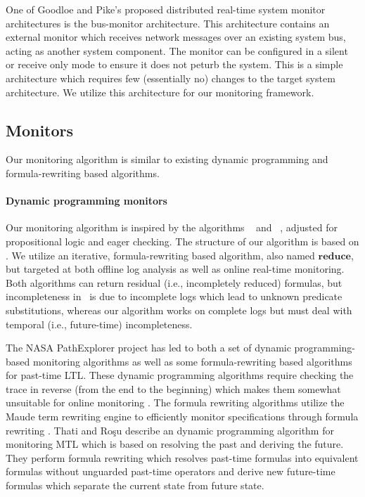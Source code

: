 One of Goodloe and Pike's proposed distributed real-time system monitor architectures is the bus-monitor architecture.
This architecture contains an external monitor which receives network messages over an existing system bus, acting as another system component.
The monitor can be configured in a silent or receive only mode to ensure it does not peturb the system. 
This is a simple architecture which requires few (essentially no) changes to the target system architecture. We utilize this architecture for our monitoring framework. 


\subsection{Monitors}
Our monitoring algorithm is similar to existing dynamic programming and formula-rewriting based algorithms. 
\paragraph{Dynamic programming monitors}
Our monitoring algorithm is inspired by the algorithms \greduce\ \cite{Garg2011} and \precis\ \cite{Chowdhury2014}, adjusted for propositional logic and eager checking. 
The structure of our algorithm is based on \greduce{}. 
We utilize an iterative, formula-rewriting based algorithm, also named $\mathbf{reduce}$, but targeted at both offline log analysis as well as online real-time monitoring. 
Both algorithms can return residual (i.e., incompletely reduced) formulas, but incompleteness in \greduce\ is due to incomplete logs which lead to unknown predicate substitutions, whereas our algorithm works on complete logs but must deal with temporal (i.e., future-time) incompleteness. 

The NASA PathExplorer project has led to both a set of dynamic programming-based monitoring algorithms as well as some formula-rewriting based algorithms \cite{Havelund2004} for past-time LTL. These dynamic programming algorithms require checking the trace in reverse (from the end to the beginning) which makes them somewhat unsuitable for online monitoring \cite{Havelund2002}. The formula rewriting algorithms utilize the Maude term rewriting engine to efficiently monitor specifications through formula rewriting \cite{Rosu2005}. 
%
Thati and Ro\c{s}u \cite{Thati2005} describe an dynamic programming algorithm for monitoring MTL which is based on resolving the past and deriving the future. They perform formula rewriting which resolves past-time formulas into equivalent formulas without unguarded past-time operators and derive new future-time formulas which separate the current state from future state. 

